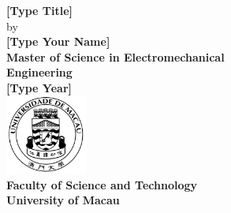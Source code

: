 \begin{titlepage}
\vspace*{\fill}
\begin{center}
{\large \bf [Type Title] \\[1.5\baselineskip] }
{ by} \\[1.5\baselineskip]
{\large \bf [Type Your Name]} \\[6\baselineskip]
{\large \bf  Master of Science in Electromechanical\\Engineering} \\[6\baselineskip]
{\large \bf [Type Year]}~\\[1\baselineskip]
\includegraphics[width=0.2\textwidth]{umaclogo.pdf}~\\%
{\large \bf Faculty of Science and Technology\\University of Macau}
\end{center}
\vspace*{\fill}
\end{titlepage}